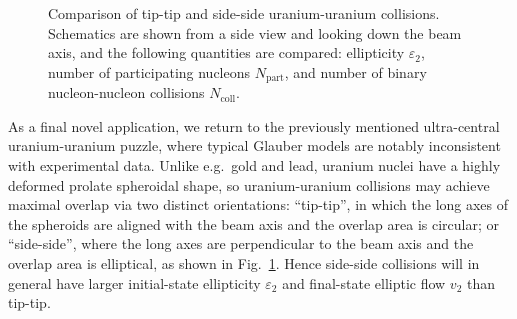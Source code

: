 \documentclass[aps,prc,reprint,amsmath]{revtex4-1}
\begin{document}
\begin{figure}[b]
  \caption{
    \label{fig:uu-schematic}
    Comparison of tip-tip and side-side uranium-uranium collisions.
    Schematics are shown from a side view and looking down the beam axis, and the following quantities are compared:
    ellipticity $\varepsilon_2$, number of participating nucleons $N_\text{part}$, and number of binary nucleon-nucleon collisions $N_\text{coll}$.
  }
\end{figure}

As a final novel application, we return to the previously mentioned ultra-central uranium-uranium puzzle, where typical Glauber models are notably inconsistent with experimental data.
Unlike e.g.~gold and lead, uranium nuclei have a highly deformed prolate spheroidal shape, so uranium-uranium collisions may achieve maximal overlap via two distinct orientations:
``tip-tip'', in which the long axes of the spheroids are aligned with the beam axis and the overlap area is circular;
or ``side-side'', where the long axes are perpendicular to the beam axis and the overlap area is elliptical, as shown in Fig.~\ref{fig:uu-schematic}.
Hence side-side collisions will in general have larger initial-state ellipticity $\varepsilon_2$ and final-state elliptic flow $v_2$ than tip-tip.
\end{document}
